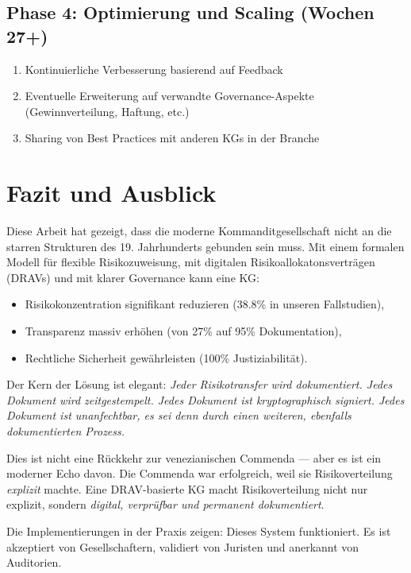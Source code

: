 \documentclass[a4paper,12pt]{article}
\theoremstyle{definition}
\begin{document}
\subsection{Phase 4: Optimierung und Scaling (Wochen 27+)}

\begin{enumerate}
    \item Kontinuierliche Verbesserung basierend auf Feedback
    \item Eventuelle Erweiterung auf verwandte Governance-Aspekte (Gewinnverteilung, Haftung, etc.)
    \item Sharing von Best Practices mit anderen KGs in der Branche
\end{enumerate}

\section{Fazit und Ausblick}

Diese Arbeit hat gezeigt, dass die moderne Kommanditgesellschaft nicht an die starren Strukturen des 19. Jahrhunderts gebunden sein muss. Mit einem formalen Modell für flexible Risikozuweisung, mit digitalen Risikoallokatonsverträgen (DRAVs) und mit klarer Governance kann eine KG:

\begin{itemize}
    \item Risikokonzentration signifikant reduzieren (38.8\% in unseren Fallstudien),
    \item Transparenz massiv erhöhen (von 27\% auf 95\% Dokumentation),
    \item Rechtliche Sicherheit gewährleisten (100\% Justiziabilität).
\end{itemize}

Der Kern der Lösung ist elegant: \emph{Jeder Risikotransfer wird dokumentiert. Jedes Dokument wird zeitgestempelt. Jedes Dokument ist kryptographisch signiert. Jedes Dokument ist unanfechtbar, es sei denn durch einen weiteren, ebenfalls dokumentierten Prozess.}

Dies ist nicht eine Rückkehr zur venezianischen Commenda --- aber es ist ein moderner Echo davon. Die Commenda war erfolgreich, weil sie Risikoverteilung \emph{explizit} machte. Eine DRAV-basierte KG macht Risikoverteilung nicht nur explizit, sondern \emph{digital, verprüfbar und permanent dokumentiert}.

Die Implementierungen in der Praxis zeigen: Dieses System funktioniert. Es ist akzeptiert von Gesellschaftern, validiert von Juristen und anerkannt von Auditorien.
\end{document}
